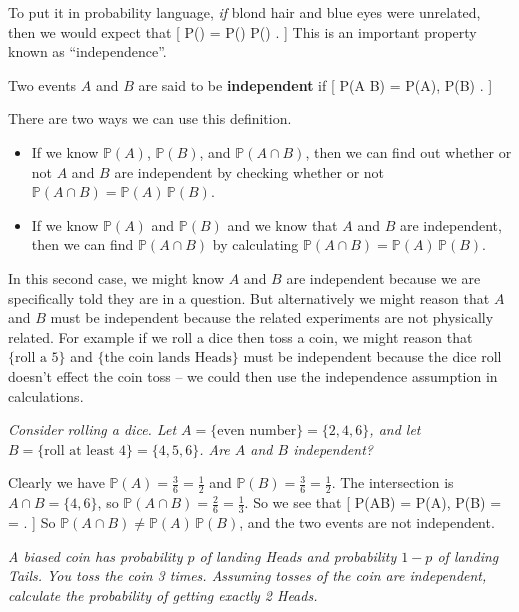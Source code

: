 \documentclass[
  letterpaper,
  DIV=11,
  numbers=noendperiod]{scrreprt}
\providecommand{\tightlist}{%
  \setlength{\itemsep}{0pt}\setlength{\parskip}{0pt}}\usepackage{longtable,booktabs,array}
\theoremstyle{remark}
\begin{document}
To put it in probability language, \emph{if} blond hair and blue eyes
were unrelated, then we would expect that {[}
\mathbb P() =
\mathbb P() \times \mathbb P() . {]}
This is an important property known as ``independence''.

Two events \(A\) and \(B\) are said to be \textbf{independent} if {[}
\mathbb P(A \cap B) = \mathbb P(A), \mathbb P(B) . {]}

There are two ways we can use this definition.

\begin{itemize}
\tightlist
\item
  If we know \(\mathbb P(A)\), \(\mathbb P(B)\), and
  \(\mathbb P(A \cap B)\), then we can find out whether or not \(A\) and
  \(B\) are independent by checking whether or not
  \(\mathbb P(A \cap B) = \mathbb P(A)\, \mathbb P(B)\).
\item
  If we know \(\mathbb P(A)\) and \(\mathbb P(B)\) and we know that
  \(A\) and \(B\) are independent, then we can find
  \(\mathbb P(A \cap B)\) by calculating
  \(\mathbb P(A \cap B) = \mathbb P(A)\, \mathbb P(B)\).
\end{itemize}

In this second case, we might know \(A\) and \(B\) are independent
because we are specifically told they are in a question. But
alternatively we might reason that \(A\) and \(B\) must be independent
because the related experiments are not physically related. For example
if we roll a dice then toss a coin, we might reason that
\(\{\text{roll a 5}\}\) and \(\{\text{the coin lands Heads}\}\) must be
independent because the dice roll doesn't effect the coin toss -- we
could then use the independence assumption in calculations.

\emph{Consider rolling a dice. Let
\(A = \{\text{even number}\} = \{2,4,6\}\), and let
\(B = \{\text{roll at least 4}\} = \{4,5,6\}\). Are \(A\) and \(B\)
independent?}

Clearly we have \(\mathbb P(A) = \frac36 = \frac12\) and
\(\mathbb P(B) = \frac 36 = \frac12\). The intersection is
\(A \cap B = \{4,6\}\), so \(\mathbb P(A \cap B) = \frac26 = \frac13\).
So we see that {[} \mathbb P(A\cap B) =  \qquad {}
\qquad  \mathbb P(A), \mathbb P(B) =  \times {} =  .
{]} So \(\mathbb P(A \cap B) \neq \mathbb P(A)\, \mathbb P(B)\), and the
two events are not independent.

\emph{A biased coin has probability \(p\) of landing Heads and
probability \(1-p\) of landing Tails. You toss the coin 3 times.
Assuming tosses of the coin are independent, calculate the probability
of getting exactly 2 Heads.}
\end{document}
